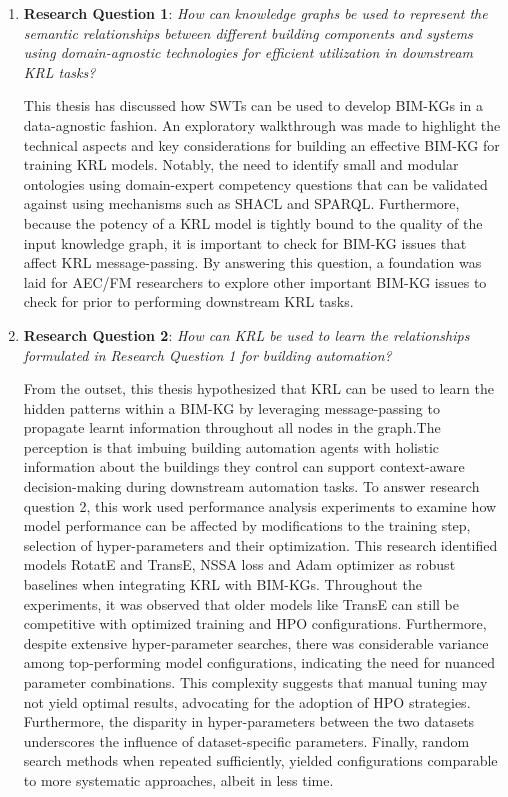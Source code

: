\begin{enumerate}
    \item 
    \textbf{Research Question 1}: \textit{How can knowledge graphs be used to represent the semantic relationships between different building components and systems using domain-agnostic technologies for efficient utilization in downstream \ac{KRL} tasks?}

    This thesis has discussed how \acp{SWT} can be used to develop \acp{BIM-KG} in a data-agnostic fashion. An exploratory walkthrough was made to highlight the technical aspects and key considerations for building an effective \ac{BIM-KG} for training \ac{KRL} models. Notably, the need to identify small and modular ontologies using domain-expert competency questions that can be validated against using mechanisms such as \ac{SHACL} and \ac{SPARQL}. Furthermore, because the potency of a \ac{KRL} model is tightly bound to the quality of the input knowledge graph, it is important to check for \ac{BIM-KG} issues that affect \ac{KRL} message-passing. By answering this question, a foundation was laid for \ac{AEC/FM} researchers to explore other important \ac{BIM-KG} issues to check for prior to performing downstream \ac{KRL} tasks.
    
    \item
    \textbf{Research Question 2}: \textit{How can KRL be used to learn the relationships formulated in Research Question 1 for building automation?}

    From the outset, this thesis hypothesized that \ac{KRL} can be used to learn the hidden patterns within a \ac{BIM-KG} by leveraging message-passing to propagate learnt information throughout all nodes in the graph.The perception is that imbuing building automation agents with holistic information about the buildings they control can support context-aware decision-making during downstream automation tasks. To answer research question 2, this work used performance analysis experiments to examine how model performance can be affected by modifications to the training step, selection of hyper-parameters and their optimization. This research identified models RotatE and TransE, NSSA loss and Adam optimizer as robust baselines when integrating \ac{KRL} with \acp{BIM-KG}. Throughout the experiments, it was observed that older models like TransE can still be competitive with optimized training and \ac{HPO} configurations. Furthermore, despite extensive hyper-parameter searches, there was considerable variance among top-performing model configurations, indicating the need for nuanced parameter combinations. This complexity suggests that manual tuning may not yield optimal results, advocating for the adoption of \ac{HPO} strategies. Furthermore, the disparity in hyper-parameters between the two datasets underscores the influence of dataset-specific parameters. Finally, random search methods when repeated sufficiently, yielded configurations comparable to more systematic approaches, albeit in less time.


\end{enumerate}
